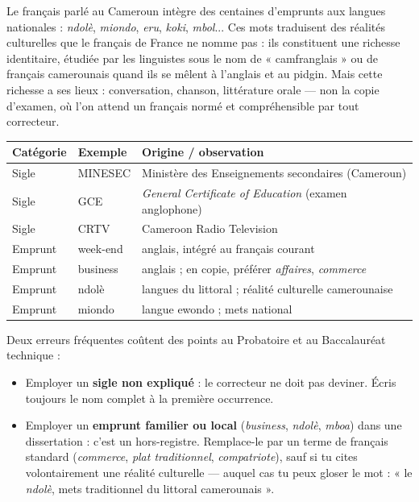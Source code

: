 \documentclass[11pt]{article}
\begin{document}
\begin{savaistu}
Le français parlé au Cameroun intègre des centaines d'emprunts aux langues nationales : \emph{ndolè}, \emph{miondo}, \emph{eru}, \emph{koki}, \emph{mbol}... Ces mots traduisent des réalités culturelles que le français de France ne nomme pas : ils constituent une richesse identitaire, étudiée par les linguistes sous le nom de « camfranglais » ou de français camerounais quand ils se mêlent à l'anglais et au pidgin. Mais cette richesse a ses lieux : conversation, chanson, littérature orale — non la copie d'examen, où l'on attend un français normé et compréhensible par tout correcteur.
\end{savaistu}

\begin{center}
\begin{tabularx}{\linewidth}{|l|X|X|}
\hline
\rowcolor{popgreenL} \textbf{Catégorie} & \textbf{Exemple} & \textbf{Origine / observation} \\
\hline
Sigle & MINESEC & Ministère des Enseignements secondaires (Cameroun) \\
\hline
Sigle & GCE & \emph{General Certificate of Education} (examen anglophone) \\
\hline
Sigle & CRTV & Cameroon Radio Television \\
\hline
Emprunt & week-end & anglais, intégré au français courant \\
\hline
Emprunt & business & anglais ; en copie, préférer \emph{affaires}, \emph{commerce} \\
\hline
Emprunt & ndolè & langues du littoral ; réalité culturelle camerounaise \\
\hline
Emprunt & miondo & langue ewondo ; mets national \\
\hline
\end{tabularx}
\end{center}

\begin{attention}
Deux erreurs fréquentes coûtent des points au Probatoire et au Baccalauréat technique :
\begin{itemize}
\item Employer un \textbf{sigle non expliqué} : le correcteur ne doit pas deviner. Écris toujours le nom complet à la première occurrence.
\item Employer un \textbf{emprunt familier ou local} (\emph{business}, \emph{ndolè}, \emph{mboa}) dans une dissertation : c'est un hors-registre. Remplace-le par un terme de français standard (\emph{commerce}, \emph{plat traditionnel}, \emph{compatriote}), sauf si tu cites volontairement une réalité culturelle — auquel cas tu peux gloser le mot : « le \emph{ndolè}, mets traditionnel du littoral camerounais ».
\end{itemize}
\end{attention}
\end{document}
